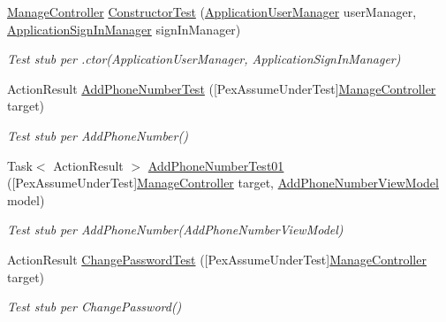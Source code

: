 \begin{DoxyCompactItemize}
\item 
\mbox{\hyperlink{class_brew_day2_1_1_controllers_1_1_manage_controller}{Manage\+Controller}} \mbox{\hyperlink{class_brew_day2_1_1_controllers_1_1_tests_1_1_manage_controller_test_a62740cf3dec4f1d7302fd6db0c592abf}{Constructor\+Test}} (\mbox{\hyperlink{class_brew_day2_1_1_application_user_manager}{Application\+User\+Manager}} user\+Manager, \mbox{\hyperlink{class_brew_day2_1_1_application_sign_in_manager}{Application\+Sign\+In\+Manager}} sign\+In\+Manager)
\begin{DoxyCompactList}\small\item\em Test stub per .ctor(\+Application\+User\+Manager, Application\+Sign\+In\+Manager)\end{DoxyCompactList}\item 
Action\+Result \mbox{\hyperlink{class_brew_day2_1_1_controllers_1_1_tests_1_1_manage_controller_test_aa20e35ce79334dab1658147186261702}{Add\+Phone\+Number\+Test}} (\mbox{[}Pex\+Assume\+Under\+Test\mbox{]}\mbox{\hyperlink{class_brew_day2_1_1_controllers_1_1_manage_controller}{Manage\+Controller}} target)
\begin{DoxyCompactList}\small\item\em Test stub per Add\+Phone\+Number()\end{DoxyCompactList}\item 
Task$<$ Action\+Result $>$ \mbox{\hyperlink{class_brew_day2_1_1_controllers_1_1_tests_1_1_manage_controller_test_a6a266f39fd002f3b7cc81174afe0cb96}{Add\+Phone\+Number\+Test01}} (\mbox{[}Pex\+Assume\+Under\+Test\mbox{]}\mbox{\hyperlink{class_brew_day2_1_1_controllers_1_1_manage_controller}{Manage\+Controller}} target, \mbox{\hyperlink{class_brew_day2_1_1_models_1_1_add_phone_number_view_model}{Add\+Phone\+Number\+View\+Model}} model)
\begin{DoxyCompactList}\small\item\em Test stub per Add\+Phone\+Number(\+Add\+Phone\+Number\+View\+Model)\end{DoxyCompactList}\item 
Action\+Result \mbox{\hyperlink{class_brew_day2_1_1_controllers_1_1_tests_1_1_manage_controller_test_ac1d0fa318e290f268adf907fb10fd139}{Change\+Password\+Test}} (\mbox{[}Pex\+Assume\+Under\+Test\mbox{]}\mbox{\hyperlink{class_brew_day2_1_1_controllers_1_1_manage_controller}{Manage\+Controller}} target)
\begin{DoxyCompactList}\small\item\em Test stub per Change\+Password()\end{DoxyCompactList}\item 

\end{DoxyCompactItemize}
